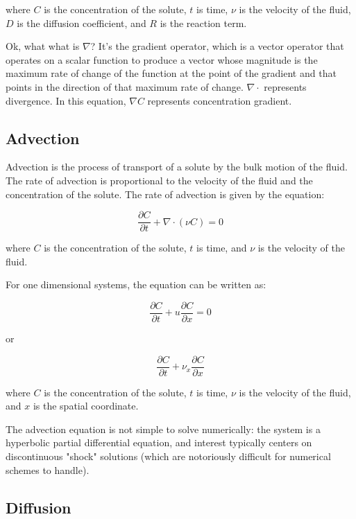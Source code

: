 \documentclass{tufte-handout}\usepackage[]{graphicx}\usepackage[]{xcolor}
\begin{document}
where $C$ is the concentration of the solute, $t$ is time, $\nu$ is the velocity of the fluid, $D$ is the diffusion coefficient, and $R$ is the reaction term.

Ok, what what is $\nabla$? It's the gradient operator, which is a vector operator that operates on a scalar function to produce a vector whose magnitude is the maximum rate of change of the function at the point of the gradient and that points in the direction of that maximum rate of change. $\nabla \cdot$ represents divergence. In this equation, $\nabla C$ represents concentration gradient.

\subsection{Advection}

Advection is the process of transport of a solute by the bulk motion of the fluid. The rate of advection is proportional to the velocity of the fluid and the concentration of the solute. The rate of advection is given by the equation:

\begin{equation}
\frac{\partial C}{\partial t} + \nabla \cdot (\nu C) = 0
\end{equation}

where $C$ is the concentration of the solute, $t$ is time, and $\nu$ is the velocity of the fluid. 

For one dimensional systems, the equation can be written as:

\begin{equation}
\frac{\partial C}{\partial t} + u \frac{\partial C}{\partial x} = 0
\end{equation}

or

\begin{equation}
\frac{\partial C}{\partial t} + \nu_x \frac{\partial C}{\partial x}
\end{equation}

where $C$ is the concentration of the solute, $t$ is time, $\nu$ is the velocity of the fluid, and $x$ is the spatial coordinate.

The advection equation is not simple to solve numerically: the system is a hyperbolic partial differential equation, and interest typically centers on discontinuous "shock" solutions (which are notoriously difficult for numerical schemes to handle).


\subsection{Diffusion}
\end{document}

